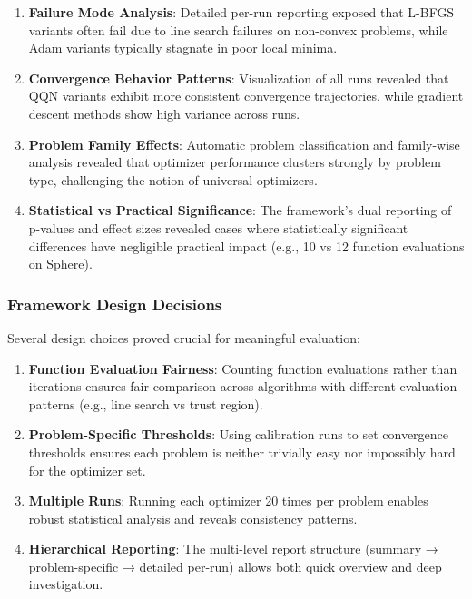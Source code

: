 \begin{enumerate}
\def\labelenumi{\arabic{enumi}.}
\tightlist
\item
  \textbf{Failure Mode Analysis}: Detailed per-run reporting exposed that L-BFGS variants often fail due to line search failures on non-convex problems, while Adam variants typically stagnate in poor local minima.
\item
  \textbf{Convergence Behavior Patterns}: Visualization of all runs revealed that QQN variants exhibit more consistent convergence trajectories, while gradient descent methods show high variance across runs.
\item
  \textbf{Problem Family Effects}: Automatic problem classification and family-wise analysis revealed that optimizer performance clusters strongly by problem type, challenging the notion of universal optimizers.
\item
  \textbf{Statistical vs Practical Significance}: The framework's dual reporting of p-values and effect sizes revealed cases where statistically significant differences have negligible practical impact (e.g., 10 vs 12 function evaluations on Sphere).
\end{enumerate}

\hypertarget{framework-design-decisions}{%
\subsubsection{Framework Design Decisions}\label{framework-design-decisions}}

Several design choices proved crucial for meaningful evaluation:

\begin{enumerate}
\def\labelenumi{\arabic{enumi}.}
\tightlist
\item
  \textbf{Function Evaluation Fairness}: Counting function evaluations rather than iterations ensures fair comparison across algorithms with different evaluation patterns (e.g., line search vs trust region).
\item
  \textbf{Problem-Specific Thresholds}: Using calibration runs to set convergence thresholds ensures each problem is neither trivially easy nor impossibly hard for the optimizer set.
\item
  \textbf{Multiple Runs}: Running each optimizer 20 times per problem enables robust statistical analysis and reveals consistency patterns.
\item
  \textbf{Hierarchical Reporting}: The multi-level report structure (summary → problem-specific → detailed per-run) allows both quick overview and deep investigation.
\end{enumerate}

